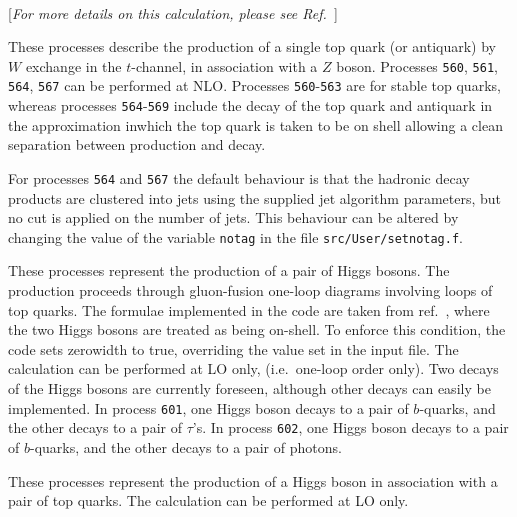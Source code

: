 \

\begin{center}
[{\it For more details on this calculation, please see Ref.~\cite{Campbell:2013yla}}]
\end{center}

\label{subsec:Zt}
These processes describe the production of a single top quark (or antiquark) by $W$ exchange in the
$t$-channel, in association with a $Z$ boson. Processes {\tt 560}, {\tt 561},
{\tt 564}, {\tt 567} can be performed at NLO.
Processes {\tt  560}-{\tt 563} are for stable top quarks, whereas processes {\tt 564}-{\tt 569}
include the decay of the top quark and antiquark
in the approximation inwhich the top quark is taken to
be on shell allowing a clean separation
between production and decay.

For processes {\tt 564} and {\tt 567} the default behaviour is that the hadronic decay products
are clustered into jets using the supplied jet
algorithm parameters, but no cut is applied on the number of jets.
This behaviour can be altered by changing the value of the
variable {\tt notag} in the file {\tt src/User/setnotag.f}.

These processes represent the production of a pair of Higgs bosons.
The production proceeds through gluon-fusion one-loop diagrams involving loops 
of top quarks. The formulae implemented in the code are taken from ref.~\cite{Glover:1987nx},
where the two Higgs bosons are treated as being on-shell. To enforce this 
condition, the code sets zerowidth to true, overriding the value set in the input file.
The calculation can be performed at LO only, (i.e.\ one-loop order only).
Two decays of the Higgs bosons are currently foreseen, although other decays can easily be implemented. 
In process {\tt 601}, one Higgs boson decays to
a pair of $b$-quarks, and the other decays to a pair of $\tau$'s.
In process {\tt 602}, one Higgs boson decays to
a pair of $b$-quarks, and the other decays to a pair of photons.

\label{subsec:htt}

These processes represent the production of a Higgs boson in association
with a pair of top quarks. The calculation can be performed at LO only.

